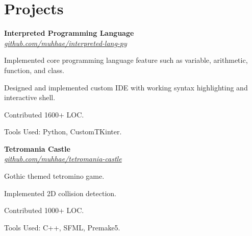 \section{Projects}
    \begin{twocolentry}{
    }
    \textbf{Interpreted Programming Language}\\
    \textit{\href{https://github.com/muhhae/interpreted-lang-py}{github.com/muhhae/interpreted-lang-py}}
    \end{twocolentry}

    \vspace{0.10 cm}
    \begin{onecolentry}
        \begin{highlights}
            \item Implemented core programming language feature such as variable, arithmetic, function,
                and class.
            \item Designed and implemented custom IDE with working syntax highlighting and interactive shell.
            \item Contributed 1600+ LOC.
            \item Tools Used: Python, CustomTKinter.
        \end{highlights}
    \end{onecolentry}

    \vspace{0.2 cm}

    \begin{twocolentry}{
    }
    \textbf{Tetromania Castle}\\
    \textit{\href{https://github.com/muhhae/tetromania-castle}{github.com/muhhae/tetromania-castle}}
    \end{twocolentry}

    \vspace{0.10 cm}
    \begin{onecolentry}
        \begin{highlights}
            \item Gothic themed tetromino game.
            \item Implemented 2D collision detection.
            \item Contributed 1000+ LOC.
            \item Tools Used: C++, SFML, Premake5.
        \end{highlights}
    \end{onecolentry}

    \vspace{0.2 cm}

